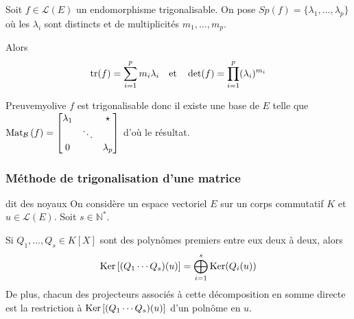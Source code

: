     \begin{prop}{}{}
        Soit $f \in \mathcal{L}(E)$ un endomorphisme trigonalisable. On pose $Sp(f) = \big\{ \lambda_1 , \ldots, \lambda_p  \big\}$ où les $\lambda_i$ sont distincts et de multiplicités $m_1,\ldots,m_p$.

        Alors \[ \operatorname{tr}(f) = \sum_{i=1}^{p} m_i \lambda_i \quad \text{et} \quad \operatorname{det}(f) = \prod_{i=1}^{p} (\lambda_i)^{m_i} \]
    \end{prop}

    \begin{demo}{Preuve}{myolive}
        $f$ est trigonalisable donc il existe une base de $E$ telle que $\text{Mat}_{\mathcal{B}}\left(f\right) = \begin{bmatrix}
            \lambda_1 & & \star \\
            & \ddots & \\
            0 & & \lambda_p
        \end{bmatrix}$ d’où le résultat.
    \end{demo}

    \subsubsection{Méthode de trigonalisation d’une matrice}

    \begin{lem}{dit des noyaux}{}
        On considère un espace vectoriel $E$ sur un corps commutatif $K$ et $u \in \mathcal{L}(E)$. Soit $s \in \mathbb{N}^*$.

        Si $Q_1,\ldots,Q_s \in K[X]$ sont des polynômes premiers entre eux deux à deux, alors 
        \[ \operatorname{Ker}\left[(Q_1\cdots Q_s)(u)\right] = \bigoplus_{i=1}^s \operatorname{Ker}(Q_i(u)) \]
        De plus, chacun des projecteurs associés à cette décomposition en somme directe est la restriction à $\operatorname{Ker}\left[(Q_1\cdots Q_s)(u)\right]$ d’un polnôme en $u$.
    \end{lem}

